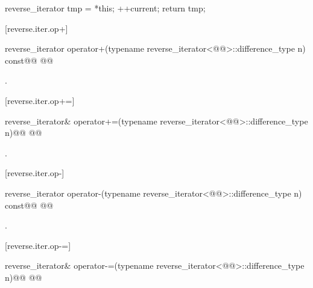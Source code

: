 \begin{itemdescr}
\pnum
\effects
\begin{codeblock}
reverse_iterator tmp = *this;
++current;
return tmp;
\end{codeblock}
\end{itemdescr}

[reverse.iter.op+]{}

%
\begin{itemdecl}
reverse_iterator
operator+(typename reverse_iterator<@@>::difference_type n) const@\removed{;}@
  @@
\end{itemdecl}

\begin{itemdescr}
\pnum
\returns
{}.
\end{itemdescr}

[reverse.iter.op+=]{}

%
\begin{itemdecl}
reverse_iterator&
operator+=(typename reverse_iterator<@@>::difference_type n)@\removed{;}@
  @@
\end{itemdecl}

\begin{itemdescr}
\pnum
\effects
{}

\pnum
\returns
{}.
\end{itemdescr}

[reverse.iter.op-]{}

%
\begin{itemdecl}
reverse_iterator
operator-(typename reverse_iterator<@@>::difference_type n) const@\removed{;}@
  @@
\end{itemdecl}

\begin{itemdescr}
\pnum
\returns
{}.
\end{itemdescr}

[reverse.iter.op-=]{}

%
\begin{itemdecl}
reverse_iterator&
operator-=(typename reverse_iterator<@@>::difference_type n)@\removed{;}@
  @@
\end{itemdecl}

